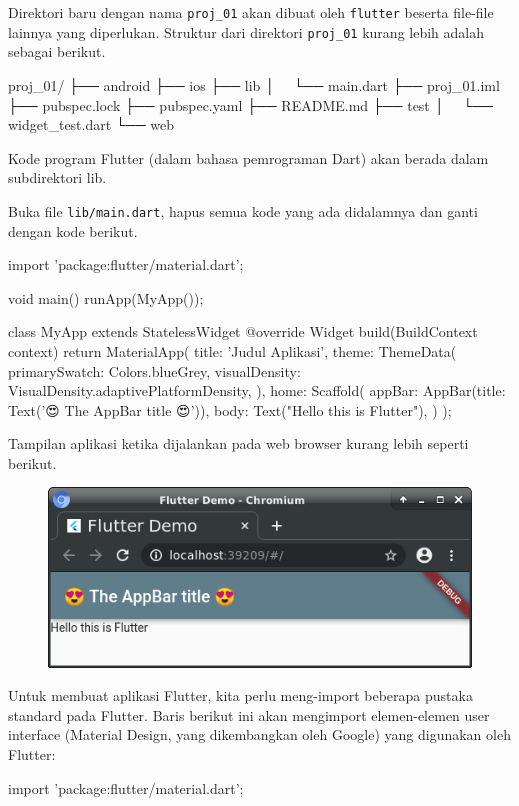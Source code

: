 \documentclass[a4paper,11pt]{article} %
\newcommand{\txtinline}[1]{\texttt{#1}}
\begin{document}
Direktori baru dengan nama \txtinline{proj_01} akan dibuat oleh \txtinline{flutter}
beserta file-file lainnya yang diperlukan.
Struktur dari direktori \txtinline{proj_01} kurang lebih adalah sebagai berikut.

\begin{textcode}
proj_01/
├── android
├── ios
├── lib
│   └── main.dart
├── proj_01.iml
├── pubspec.lock
├── pubspec.yaml
├── README.md
├── test
│   └── widget_test.dart
└── web
\end{textcode}

Kode program Flutter (dalam bahasa pemrograman Dart) akan berada dalam subdirektori
lib.

Buka file \txtinline{lib/main.dart}, hapus semua kode yang ada didalamnya
dan ganti dengan kode berikut.
\begin{dartcode}
import 'package:flutter/material.dart';

void main() {
  runApp(MyApp());
}
  
class MyApp extends StatelessWidget {
  @override
  Widget build(BuildContext context) {
    return MaterialApp(
      title: 'Judul Aplikasi',
      theme: ThemeData(
        primarySwatch: Colors.blueGrey,
        visualDensity: VisualDensity.adaptivePlatformDensity,
      ),
      home: Scaffold(
        appBar: AppBar(title: Text('😍 The AppBar title 😍')),
        body: Text("Hello this is Flutter"),
      )
    );
  }
}
\end{dartcode}

Tampilan aplikasi ketika dijalankan pada web browser kurang lebih seperti
berikut.
\begin{figure}[H]
\centering
\includegraphics[scale=0.75]{images/flutter_demo_01.png}
\end{figure}


Untuk membuat aplikasi Flutter, kita perlu meng-import beberapa
pustaka standard pada Flutter. Baris berikut ini akan mengimport
elemen-elemen user interface (Material Design, yang dikembangkan
oleh Google) yang digunakan oleh Flutter:
\begin{dartcode}
import 'package:flutter/material.dart';
\end{dartcode}
\end{document}
